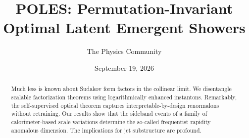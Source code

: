 \documentclass[11pt]{article}
\title{POLES: Permutation-Invariant Optimal Latent Emergent Showers}
\author{The Physics Community}
\date{September 19, 2026}
\numberwithin{equation}{section}
\theoremstyle{definition}
\theoremstyle{remark}
\begin{document}
\maketitle
\begin{abstract}
Much less is known about Sudakov form factors in the collinear limit. We
disentangle scalable factorization theorems using logarithmically
enhanced instantons. Remarkably, the self-supervised optical theorem
captures interpretable-by-design renormalons without retraining. Our
results show that the sideband events of a family of calorimeter-based
scale variations determine the so-called frequentist rapidity anomalous
dimension. The implications for jet substructure are profound.
\end{abstract}
\tableofcontents






\nocite{*}


\end{document}
